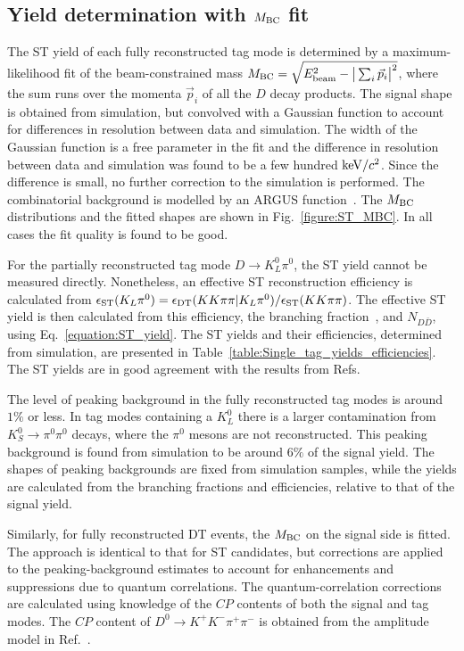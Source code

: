 \documentclass[12pt, a4paper, notitlepage, onecolumn]{article}
\begin{document}
\subsection{Yield determination with $M_{\rm BC}$ fit}
\noindent The ST yield of each fully reconstructed tag mode is determined by a maximum-likelihood fit of the beam-constrained mass $M_{\rm BC} = \sqrt{E_{\rm beam}^2 - \big\lvert\sum_i\vec{p}_i\big\rvert^2}$, where the sum runs over the momenta $\vec{p}_i$ of all the $D$ decay products. The signal shape is obtained from simulation, but convolved with a Gaussian function to account for differences in resolution between data and simulation. The width of the Gaussian function is a free parameter in the fit and the difference in resolution between data and simulation was found to be a few hundred ${\rm keV}/c^2$. Since the difference is small, no further correction to the simulation is performed. The combinatorial background is modelled by an ARGUS function~\cite{cite:Argus}. The $M_{\rm BC}$ distributions and the fitted shapes are shown in Fig.~\ref{figure:ST_MBC}. In all cases the fit quality is found to be good.

For the partially reconstructed tag mode $D\to K_L^0\pi^0$, the ST yield cannot be measured directly. Nonetheless, an effective ST reconstruction efficiency is calculated from $\epsilon_{\rm ST}(K_L\pi^0) = \epsilon_{\rm DT}(KK\pi\pi|K_L\pi^0)/\epsilon_{\rm ST}(KK\pi\pi)$. The effective ST yield is then calculated from this efficiency, the branching fraction~\cite{cite:deltaKpi}, and $N_{D\bar{D}}$, using Eq.~\eqref{equation:ST_yield}. The ST yields and their efficiencies, determined from simulation, are presented in Table~\ref{table:Single_tag_yields_efficiencies}. The ST yields are in good agreement with the results from Refs.~\cite{cite:KSpipiStrongPhase, cite:cisiKSKK, BESIII:fourpi}

The level of peaking background in the fully reconstructed tag modes is around $1\%$ or less. In tag modes containing a $K_L^0$ there is a larger contamination from $K_S^0\to\pi^0\pi^0$ decays, where the $\pi^0$ mesons are not reconstructed. This peaking background is found from simulation to be around $6\%$ of the signal yield. The shapes of peaking backgrounds are fixed from simulation samples, while the yields are calculated from the branching fractions and efficiencies, relative to that of the signal yield.

Similarly, for fully reconstructed DT events, the $M_{\rm BC}$ on the signal side is fitted. The approach is identical to that for ST candidates, but corrections are applied to the peaking-background estimates to account for enhancements and suppressions due to quantum correlations. The quantum-correlation corrections are calculated using knowledge of the $C\!P$ contents of both the signal and tag modes. The $C\!P$ content of $D^0\to K^+K^-\pi^+\pi^-$ is obtained from the amplitude model in Ref.~\cite{LHCb-PAPER-2018-041}.
\end{document}
